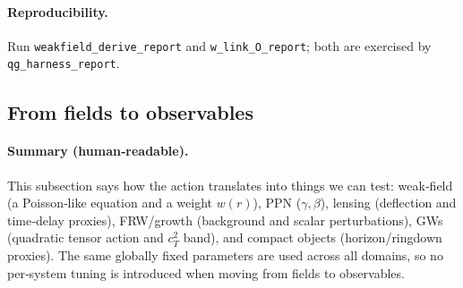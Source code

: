 \documentclass[aps,prd,twocolumn,superscriptaddress,nofootinbib,floatfix,longbibliography]{revtex4-2}
\begin{document}
\paragraph*{Reproducibility.}
Run \texttt{weakfield\_derive\_report} and \texttt{w\_link\_O\_report}; both are exercised by \texttt{qg\_harness\_report}.

\subsection{From fields to observables}
\paragraph*{Summary (human‑readable).}
This subsection says how the action translates into things we can test: weak‑field (a Poisson‑like equation and a weight \(w(r)\)), PPN (\(\gamma,\beta\)), lensing (deflection and time‑delay proxies), FRW/growth (background and scalar perturbations), GWs (quadratic tensor action and \(c_T^2\) band), and compact objects (horizon/ringdown proxies). The same globally fixed parameters are used across all domains, so no per‑system tuning is introduced when moving from fields to observables.
\end{document}
